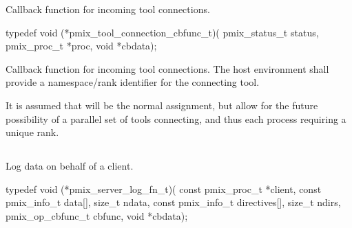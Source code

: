 \summary

Callback function for incoming tool connections.

\format

\cspecificstart
\begin{codepar}
typedef void (*pmix_tool_connection_cbfunc_t)(
                    pmix_status_t status,
                    pmix_proc_t *proc, void *cbdata);
\end{codepar}
\cspecificend

\begin{arglist}
\end{arglist}

\descr

Callback function for incoming tool connections.
The host environment shall provide a namespace/rank identifier for the connecting tool.

\advicermstart
It is assumed that  will be the normal assignment, but allow for the future possibility of a parallel set of tools connecting, and thus each process requiring a unique rank.
\advicermend


\subsection{}

\summary

Log data on behalf of a client.

\format

\cspecificstart
\begin{codepar}
typedef void (*pmix_server_log_fn_t)(
                    const pmix_proc_t *client,
                    const pmix_info_t data[], size_t ndata,
                    const pmix_info_t directives[], size_t ndirs,
                    pmix_op_cbfunc_t cbfunc, void *cbdata);
\end{codepar}
\cspecificend

\begin{arglist}
\end{arglist}


